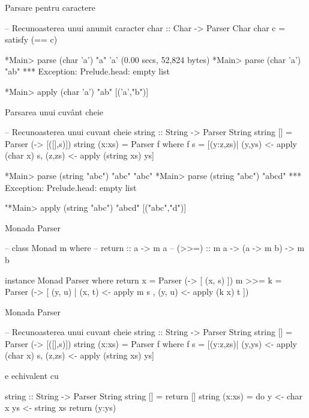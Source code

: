 \documentclass[xcolor=x11names,compress,10pt]{beamer}
\begin{document}
\begin{frame}[fragile]{Parsare pentru caractere}
\begin{asciihs}
  -- Recunoasterea unui anumit caracter
  char :: Char -> Parser Char
  char c = satisfy (== c)
\end{asciihs}

\pause 
\begin{asciihs}
*Main> parse (char 'a') "a"
'a'
(0.00 secs, 52,824 bytes)
*Main> parse (char 'a') "ab"
*** Exception: Prelude.head: empty list

*Main>  apply (char 'a') "ab"
[('a',"b")]
\end{asciihs}
\end{frame}

\begin{frame}[fragile]{Parsarea unui cuvânt cheie}
\begin{asciihs}
-- Recunoasterea unui cuvant cheie
string :: String -> Parser String
string [] = Parser (\s -> [([],s)])
string (x:xs) = Parser f  
 where
   f s = [(y:z,zs)| (y,ys) <- apply (char x) s, 
                    (z,zs) <- apply (string xs) ys]
\end{asciihs}

\pause
\begin{asciihs}
*Main> parse (string "abc") "abc"
"abc"
*Main> parse (string "abc") "abcd"
*** Exception: Prelude.head: empty list

"*Main> apply  (string "abc") "abcd"
[("abc","d")]
\end{asciihs}
\end{frame}

\begin{frame}[fragile]{Monada Parser}
\begin{asciihs}

  --   class Monad m where
  --     return :: a -> m a
  --     (>>=) :: m a -> (a -> m b) -> m b

  instance Monad Parser where
    return x  = Parser (\s -> [ (x, s) ])
    m >>= k   = Parser (\s -> [ (y, u)
                              | (x, t) <- apply m s
                              , (y, u) <- apply (k x) t
                              ])
\end{asciihs}
\end{frame}

\begin{frame}[fragile]{Monada Parser}
\begin{asciihs}
-- Recunoasterea unui cuvant cheie
string :: String -> Parser String
string [] = Parser (\s -> [([],s)])
string (x:xs) = Parser f  
 where
   f s = [(y:z,zs)| (y,ys) <- apply (char x) s, 
                    (z,zs) <- apply (string xs) ys]
\end{asciihs}

e echivalent cu 

\begin{asciihs}
  string :: String -> Parser String
  string []     = return []
  string (x:xs) = do  y  <- char x
                      ys <- string xs
                      return (y:ys)

\end{asciihs}
\end{frame}
\end{document}

